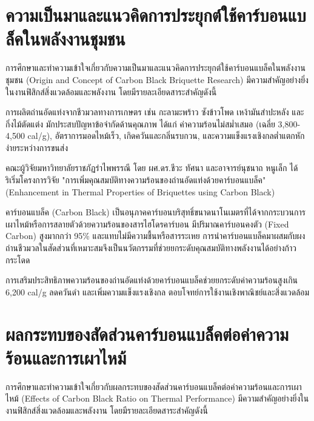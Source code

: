 
\section{ความเป็นมาและแนวคิดการประยุกต์ใช้คาร์บอนแบล็คในพลังงานชุมชน}

การศึกษาและทำความเข้าใจเกี่ยวกับความเป็นมาและแนวคิดการประยุกต์ใช้คาร์บอนแบล็คในพลังงานชุมชน (Origin and Concept of Carbon Black Briquette Research) มีความสำคัญอย่างยิ่งในงานฟิสิกส์สิ่งแวดล้อมและพลังงาน โดยมีรายละเอียดสาระสำคัญดังนี้

การผลิตถ่านอัดแท่งจากชีวมวลทางการเกษตร เช่น กะลามะพร้าว ซังข้าวโพด เหง้ามันสำปะหลัง และกิ่งไม้ตัดแต่ง มักประสบปัญหาข้อจำกัดด้านคุณภาพ ได้แก่ ค่าความร้อนไม่สม่ำเสมอ (เฉลี่ย 3,800-4,500 cal/g), อัตราการมอดไหม้เร็ว, เกิดควันและกลิ่นรบกวน, และความแข็งแรงเชิงกลต่ำแตกหักง่ายระหว่างการขนส่ง

คณะผู้วิจัยมหาวิทยาลัยราชภัฏรำไพพรรณี โดย ผศ.ดร.ชีวะ ทัศนา และอาจารย์นุชนาถ หนูเล็ก ได้ริเริ่มโครงการวิจัย "การเพิ่มคุณสมบัติทางความร้อนของถ่านอัดแท่งด้วยคาร์บอนแบล็ค" (Enhancement in Thermal Properties of Briquettes using Carbon Black)

คาร์บอนแบล็ค (Carbon Black) เป็นอนุภาคคาร์บอนบริสุทธิ์ขนาดนาโนเมตรที่ได้จากกระบวนการเผาไหม้หรือการสลายตัวด้วยความร้อนของสารไฮโดรคาร์บอน มีปริมาณคาร์บอนคงตัว (Fixed Carbon) สูงมากกว่า 95\% และแทบไม่มีความชื้นหรือสารระเหย การนำคาร์บอนแบล็คมาผสมกับผงถ่านชีวมวลในสัดส่วนที่เหมาะสมจึงเป็นนวัตกรรมที่ช่วยยกระดับคุณสมบัติทางพลังงานได้อย่างก้าวกระโดด

\begin{flamebox}
การเสริมประสิทธิภาพความร้อนของถ่านอัดแท่งด้วยคาร์บอนแบล็คช่วยยกระดับค่าความร้อนสูงเกิน 6,200 cal/g ลดควันดำ และเพิ่มความแข็งแรงเชิงกล ตอบโจทย์การใช้งานเชิงพาณิชย์และสิ่งแวดล้อม
\end{flamebox}

\section{ผลกระทบของสัดส่วนคาร์บอนแบล็คต่อค่าความร้อนและการเผาไหม้}

การศึกษาและทำความเข้าใจเกี่ยวกับผลกระทบของสัดส่วนคาร์บอนแบล็คต่อค่าความร้อนและการเผาไหม้ (Effects of Carbon Black Ratio on Thermal Performance) มีความสำคัญอย่างยิ่งในงานฟิสิกส์สิ่งแวดล้อมและพลังงาน โดยมีรายละเอียดสาระสำคัญดังนี้

